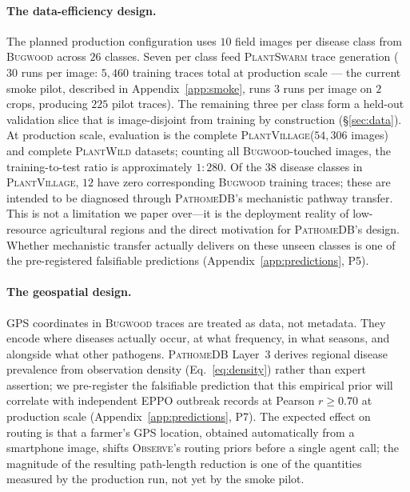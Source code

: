 \documentclass[11pt,twocolumn]{article}
\newcommand{\observe}{\textsc{Observe}\xspace}
\newcommand{\plantswarm}{\textsc{PlantSwarm}\xspace}
\newcommand{\pathomedb}{\textsc{PathomeDB}\xspace}
\newcommand{\bugwood}{\textsc{Bugwood}\xspace}
\newcommand{\pv}{\textsc{PlantVillage}\xspace}
\newcommand{\pw}{\textsc{PlantWild}\xspace}
\begin{document}
\paragraph{The data-efficiency design.}
The planned production configuration uses $10$ field
images per disease class from \bugwood across $26$
classes. Seven per class feed \plantswarm trace
generation ($30$ runs per image: $5{,}460$ training
traces total at production scale --- the current
smoke pilot, described in Appendix~\ref{app:smoke},
runs $3$ runs per image on $2$ crops, producing
$225$ pilot traces). The remaining three per class
form a held-out validation slice that is
image-disjoint from training by construction
(\S\ref{sec:data}). At production scale, evaluation
is the complete \pv ($54{,}306$ images) and complete
\pw datasets; counting all \bugwood-touched images,
the training-to-test ratio is approximately
$1:280$. Of the $38$ disease classes in \pv, $12$
have zero corresponding \bugwood training traces;
these are intended to be diagnosed through
\pathomedb's mechanistic pathway transfer. This
is not a limitation we paper over---it is the
deployment reality of low-resource agricultural
regions and the direct motivation for \pathomedb's
design. Whether mechanistic transfer actually
delivers on these unseen classes is one of the
pre-registered falsifiable predictions
(Appendix~\ref{app:predictions}, P5).

\paragraph{The geospatial design.}
GPS coordinates in \bugwood traces are treated as
data, not metadata. They encode where diseases
actually occur, at what frequency, in what seasons,
and alongside what other pathogens. \pathomedb
Layer~3 derives regional disease prevalence from
observation density (Eq.~\ref{eq:density}) rather
than expert assertion; we pre-register the
falsifiable prediction that this empirical prior
will correlate with independent EPPO outbreak
records at Pearson $r{\geq}0.70$ at production
scale (Appendix~\ref{app:predictions}, P7). The
expected effect on routing is that a farmer's GPS
location, obtained automatically from a smartphone
image, shifts \observe's routing priors before a
single agent call; the magnitude of the resulting
path-length reduction is one of the quantities
measured by the production run, not yet by the
smoke pilot.
\end{document}

